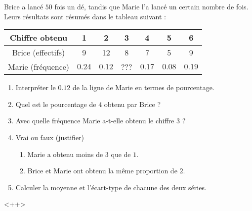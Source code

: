 
\begin{exercice}\label{exosmath-0216}

    Brice a lancé \( 50\) fois un dé, tandis que Marie l'a lancé un certain nombre de fois. Leurs résultats sont résumés dans le tableau suivant :
    \begin{center}
        \begin{tabular}[]{|c||c|c|c|c|c|c|}
            \hline
            Chiffre obtenu&1&2&3&4&5&6\\
            \hline\hline
            Brice (effectifs)&9&12&8&7&5&9\\
            \hline
            Marie (fréquence)&$0.24$&$0.12$&???&$0.17$&$0.08$&$0.19$\\
            \hline
        \end{tabular}
    \end{center}
    \begin{enumerate}
        \item
            Interpréter le \( 0.12\) de la ligne de Marie en termes de pourcentage.
            \item
                Quel est le pourcentage de $4$ obtenu par Brice ?
        \item
            Avec quelle fréquence Marie a-t-elle obtenu le chiffre \( 3\) ?
        \item
            Vrai ou faux (justifier)
            \begin{enumerate}
                \item
                    Marie a obtenu moins de \( 3\) que de \( 1\).
                \item
                    Brice et Marie ont obtenu la même proportion de \( 2\).
            \end{enumerate}
        \item
            Calculer la moyenne et l'écart-type de chacune des deux séries.
    \end{enumerate}
    <++>


\end{exercice}
